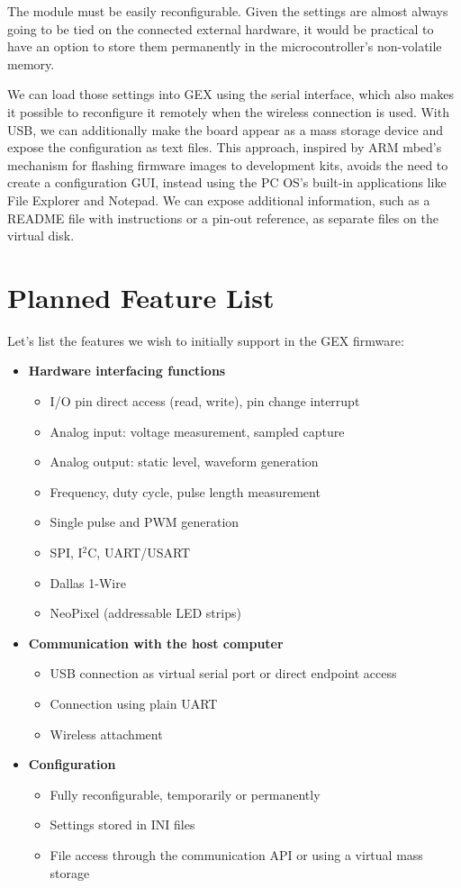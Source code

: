 The module must be easily reconfigurable. Given the settings are almost always going to be tied on the connected external hardware, it would be practical to have an option to store them permanently in the microcontroller's non-volatile memory.

We can load those settings into GEX using the serial interface, which also makes it possible to reconfigure it remotely when the wireless connection is used. With USB, we can additionally make the board appear as a mass storage device and expose the configuration as text files. This approach, inspired by ARM mbed's mechanism for flashing firmware images to development kits, avoids the need to create a configuration GUI, instead using the PC OS's built-in applications like File Explorer and Notepad. We can expose additional information, such as a README file with instructions or a pin-out reference, as separate files on the virtual disk.

\section{Planned Feature List}

Let's list the features we wish to initially support in the GEX firmware:

\begin{itemize}
	\item \textbf{Hardware interfacing functions}
		\begin{itemize}	
			\item I/O pin direct access (read, write), pin change interrupt
			\item Analog input: voltage measurement, sampled capture
			\item Analog output: static level, waveform generation
			\item Frequency, duty cycle, pulse length measurement
			\item Single pulse and PWM generation
			\item SPI, I$^2$C, UART/USART
			\item Dallas 1-Wire
			\item NeoPixel (addressable LED strips)	
		\end{itemize}
	\item \textbf{Communication with the host computer}
		\begin{itemize}	
			\item USB connection as virtual serial port or direct endpoint access
			\item Connection using plain UART
			\item Wireless attachment
		\end{itemize}
	\item \textbf{Configuration}
		\begin{itemize}
			\item Fully reconfigurable, temporarily or permanently
			\item Settings stored in INI files
			\item File access through the communication API or using a virtual mass storage
		\end{itemize}
\end{itemize}


